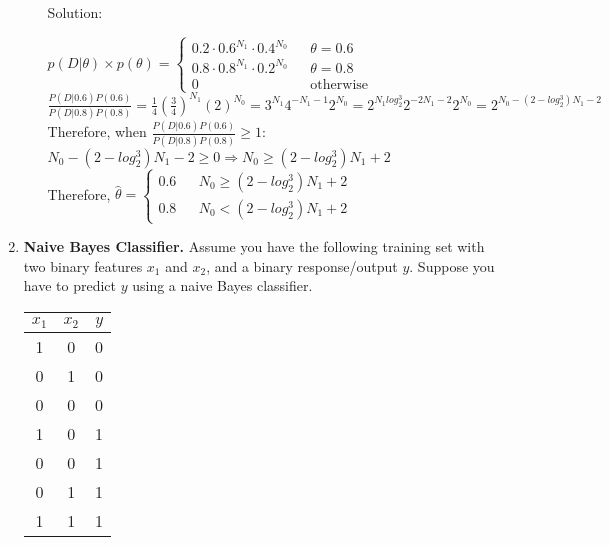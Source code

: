 \documentclass[12pt]{article}
\newcommand{\solu}{{\color{blue} Solution:}}
\begin{document}
\begin{enumerate}
\begin{enumerate}
            \solu 
            
            $p(D | \theta) \times p(\theta) =  \left\{
                \begin{array}{rcl}
                0.2\cdot 0.6^{N_1} \cdot 0.4^{N_0}  & & \theta = 0.6 \\
                0.8\cdot 0.8^{N_1} \cdot 0.2^{N_0} & & \theta = 0.8 \\
                0 & & \text{otherwise}
            \end{array}
            \right.$\\
            $\frac{P(D|0.6)P(0.6)}{P(D|0.8)P(0.8)} = \frac{1}{4}(\frac{3}{4})^{N_1}(2)^{N_0} = 3^{N_1}4^{-N_1-1}2^{N_0} = 2^{N_1log_2^3}2^{-2N_1 - 2}2^{N_0} = 2^{N_0 - (2-log_2^3)N_1 - 2}$\\
            Therefore, when $\frac{P(D|0.6)P(0.6)}{P(D|0.8)P(0.8)} \ge 1:$\\
            $N_0 -(2-log_2^3)N_1 -2 \ge 0 \Rightarrow N_0 \ge (2-log_2^3)N_1 +2$\\
            Therefore, $\hat{\theta} = \left\{
                \begin{array}{rcl}
                0.6 & & N_0 \ge (2-log_2^3)N_1 +2 \\
                0.8 & & N_0 < (2-log_2^3)N_1 +2
            \end{array}
            \right.$
        \end{enumerate}

        \item \textbf{Naive Bayes Classifier.} Assume you have the following training set with two binary features $x_1$ and $x_2$, and a binary response/output $y$. Suppose you have to predict $y$ using a naive Bayes classifier.
        \begin{center}
            \begin{tabular}{|c|c|c|}
                \hline 
                $x_1$ & $x_2$ & $y$\\ \hline 
                1 & 0 & 0\\ \hline 
                0 & 1 & 0\\ \hline 
                0 & 0 & 0\\ \hline 
                1 & 0 & 1\\ \hline 
                0 & 0 & 1\\ \hline 
                0 & 1 & 1\\ \hline 
                1 & 1 & 1 \\ \hline 
            \end{tabular}
        \end{center}
        

\end{enumerate}
\end{document}
